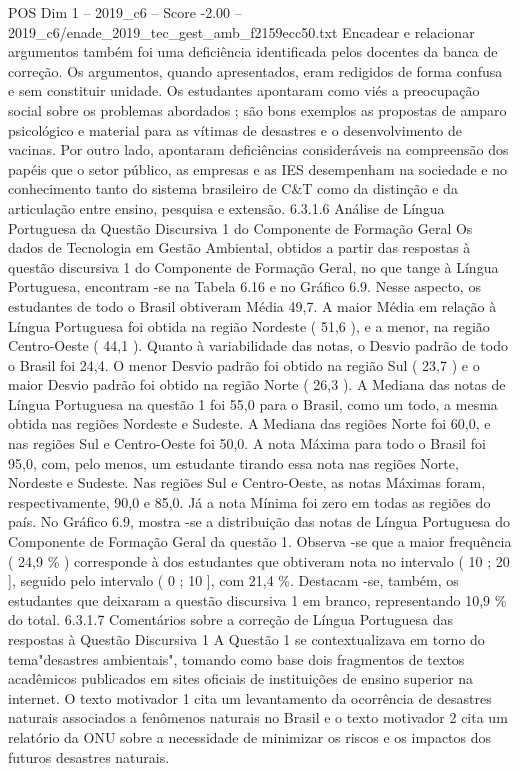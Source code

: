 \begin{textsample}{POS Dim 1 – 2019\_c6 – Score -2.00 – 2019\_c6/enade\_2019\_tec\_gest\_amb\_f2159ecc50.txt}
Encadear e relacionar argumentos também foi uma deficiência identificada pelos docentes da banca de correção.
Os argumentos, quando apresentados, eram redigidos de forma confusa e sem constituir unidade.
Os estudantes apontaram como viés a preocupação social sobre os problemas abordados ; são bons exemplos as propostas de amparo psicológico e material para as vítimas de desastres e o desenvolvimento de vacinas.
Por outro lado, apontaram deficiências consideráveis na compreensão dos papéis que o setor público, as empresas e as IES desempenham na sociedade e no conhecimento tanto do sistema brasileiro de C\&T como da distinção e da articulação entre ensino, pesquisa e extensão. 6.3.1.6 Análise de Língua Portuguesa da Questão Discursiva 1 do Componente de Formação Geral Os dados de Tecnologia em Gestão Ambiental, obtidos a partir das respostas à questão discursiva 1 do Componente de Formação Geral, no que tange à Língua Portuguesa, encontram -se na Tabela 6.16 e no Gráfico 6.9.
Nesse aspecto, os estudantes de todo o Brasil obtiveram Média 49,7.
A maior Média em relação à Língua Portuguesa foi obtida na região Nordeste ( 51,6 ), e a menor, na região Centro-Oeste ( 44,1 ).
Quanto à variabilidade das notas, o Desvio padrão de todo o Brasil foi 24,4.
O menor Desvio padrão foi obtido na região Sul ( 23,7 ) e o maior Desvio padrão foi obtido na região Norte ( 26,3 ).
A Mediana das notas de Língua Portuguesa na questão 1 foi 55,0 para o Brasil, como um todo, a mesma obtida nas regiões Nordeste e Sudeste.
A Mediana das regiões Norte foi 60,0, e nas regiões Sul e Centro-Oeste foi 50,0.
A nota Máxima para todo o Brasil foi 95,0, com, pelo menos, um estudante tirando essa nota nas regiões Norte, Nordeste e Sudeste.
Nas regiões Sul e Centro-Oeste, as notas Máximas foram, respectivamente, 90,0 e 85,0.
Já a nota Mínima foi zero em todas as regiões do país.
No Gráfico 6.9, mostra -se a distribuição das notas de Língua Portuguesa do Componente de Formação Geral da questão 1.
Observa -se que a maior frequência ( 24,9 \% ) corresponde à dos estudantes que obtiveram nota no intervalo ( 10 ; 20 ], seguido pelo intervalo ( 0 ; 10 ], com 21,4 \%.
Destacam -se, também, os estudantes que deixaram a questão discursiva 1 em branco, representando 10,9 \% do total. 6.3.1.7 Comentários sobre a correção de Língua Portuguesa das respostas à Questão Discursiva 1 A Questão 1 se contextualizava em torno do tema"desastres ambientais", tomando como base dois fragmentos de textos acadêmicos publicados em sites oficiais de instituições de ensino superior na internet.
O texto motivador 1 cita um levantamento da ocorrência de desastres naturais associados a fenômenos naturais no Brasil e o texto motivador 2 cita um relatório da ONU sobre a necessidade de minimizar os riscos e os impactos dos futuros desastres naturais.

\end{textsample}
